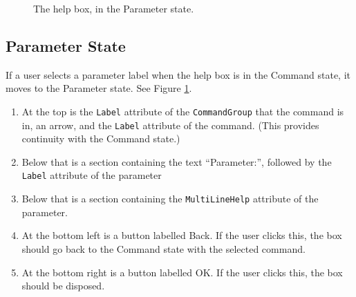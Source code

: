 \documentclass[11pt]{article}
\begin{document}
\begin{figure}

\centerline{\epsfxsize=4in }

\caption{
  The help box, in the Parameter state.
}
\label{helpBox03Fig}
\end{figure}

\subsection{Parameter State}

If a user selects a parameter label when the help box is in the
Command state, it moves to the Parameter state.
See Figure \ref{helpBox03Fig}.
\begin{enumerate}
\item At the top is the {\tt Label} attribute of the {\tt CommandGroup}
  that the command is in, an arrow, and the {\tt Label} attribute of the
  command.  (This provides continuity with the Command state.)
\item Below that is a section containing the text ``Parameter:'',
  followed by the {\tt Label} attribute of the parameter
\item Below that is a section containing the {\tt MultiLineHelp} attribute
  of the parameter.
\item At the bottom left is a button labelled Back.  If the user
  clicks this, the box should go back to the Command state with the
  selected command.
\item At the bottom right is a button labelled OK.  If the user
  clicks this, the box should be disposed.
\end{enumerate}
\end{document}
